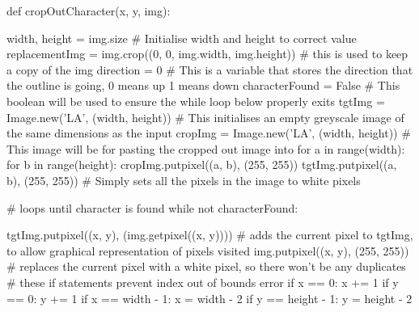 \documentclass{report}
\begin{document}
\begin{python}
def cropOutCharacter(x, y, img):

    width, height = img.size  # Initialise width and height to correct value
    replacementImg = img.crop((0, 0, img.width, img.height))  # this is used to keep a copy of the img
    direction = 0  # This is a variable that stores the direction that the outline is going, 0 means up 1 means down
    characterFound = False  # This boolean will be used to ensure the while loop below properly exits
    tgtImg = Image.new('LA', (width, height))  # This initialises an empty greyscale image of the same dimensions as the input
    cropImg = Image.new('LA', (width, height))  # This image will be for pasting the cropped out image into
    for a in range(width):
        for b in range(height):
            cropImg.putpixel((a, b), (255, 255))
            tgtImg.putpixel((a, b), (255, 255))  # Simply sets all the pixels in the image to white pixels

    # loops until character is found
    while not characterFound:

        tgtImg.putpixel((x, y), (img.getpixel((x, y))))  # adds the current pixel to tgtImg, to allow graphical representation of pixels visited
        img.putpixel((x, y), (255, 255))  # replaces the current pixel with a white pixel, so there won't be any duplicates
        #  these if statements prevent index out of bounds error
        if x == 0:
            x += 1
        if y == 0:
            y += 1
        if x == width - 1:
            x = width - 2
        if y == height - 1:
            y = height - 2


\end{python}
\end{document}
